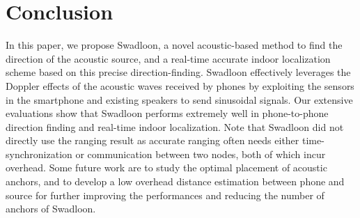 \documentclass[]{sig-alternate-10pt}
\def \ourprotocol{Swadloon\xspace}
\begin{document}
\section{Conclusion}
\label{sec:conclusion}

In this paper, we propose \ourprotocol, a novel acoustic-based method
 to find the direction of the acoustic source, and a real-time accurate
 indoor localization scheme based on this precise direction-finding.  
\ourprotocol effectively    leverages the Doppler effects of
 the acoustic waves received by phones by exploiting the 
 sensors in the smartphone and existing speakers to send sinusoidal
 signals. 
Our extensive evaluations show that \ourprotocol performs extremely
 well in phone-to-phone direction finding and real-time indoor
 localization.  Note that \ourprotocol did not directly use the ranging result as accurate ranging often needs either time-synchronization or communication between two nodes, both of which incur overhead. Some future work are to study the optimal placement of acoustic anchors,
 and to develop a low overhead distance estimation between phone and source for
 further improving the performances and reducing the number of anchors of \ourprotocol.





{\small



}
\end{document}
